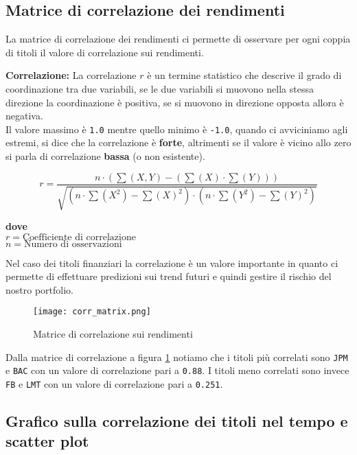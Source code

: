 \subsection{Matrice di correlazione dei rendimenti}

La matrice di correlazione dei rendimenti ci permette di osservare per ogni coppia di titoli il valore di correlazione sui rendimenti.

\textbf{Correlazione:} La correlazione \(r\) è un termine statistico che descrive il grado di coordinazione tra due variabili, se le due variabili si muovono nella stessa direzione
la coordinazione è positiva, se si muovono in direzione opposta allora è negativa.\\
Il valore massimo è \verb|1.0| mentre quello minimo è \verb|-1.0|, quando ci avviciniamo agli estremi, si dice che la correlazione è \textbf{forte}, altrimenti se il valore è vicino allo zero si parla di correlazione \textbf{bassa} (o non esistente).

\begin{displaymath}
  r = \frac{n \cdot (\sum (X, Y) - (\sum (X) \cdot \sum (Y)))}
  {\sqrt{(n \cdot \sum(X^2) - \sum (X)^2) \cdot (n \cdot \sum (Y^2) - \sum (Y)^2)}}
\end{displaymath}

\textbf{dove}\\
\(r = \text{Coefficiente di correlazione}\)\\
\(n = \text{Numero di osservazioni}\)

Nel caso dei titoli finanziari la correlazione è un valore importante in quanto ci permette di effettuare predizioni sui trend futuri e quindi gestire il rischio del nostro
portfolio.

\begin{figure}[h]
  \centering
  \texttt{[image: corr\_matrix.png]}
  \caption{Matrice di correlazione sui rendimenti}
  \label{fig:corr_matrix}
\end{figure}

Dalla matrice di correlazione a figura \ref{fig:corr_matrix} notiamo che i titoli più correlati sono \verb|JPM| e \verb|BAC| con un valore di correlazione pari a
\verb|0.88|. I titoli meno correlati sono invece \verb|FB| e \verb|LMT| con un valore di correlazione pari a \verb|0.251|.

\pagebreak

\subsection{Grafico sulla correlazione dei titoli nel tempo e scatter plot}

